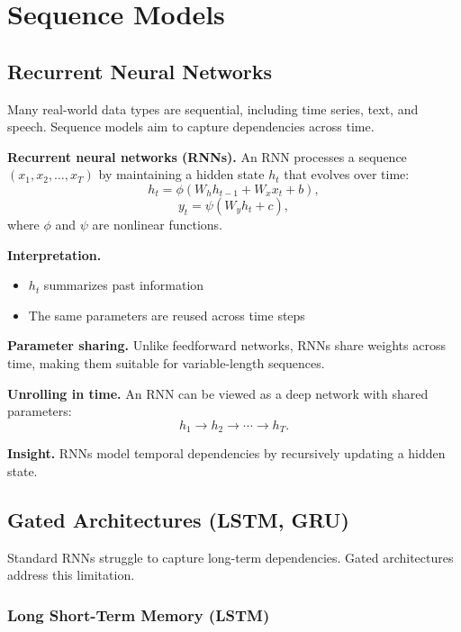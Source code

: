 \chapter{Sequence Models}

\section{Recurrent Neural Networks}

Many real-world data types are sequential, including time series, text, and speech. Sequence models aim to capture dependencies across time.

\medskip

\noindent
\textbf{Recurrent neural networks (RNNs).}  
An RNN processes a sequence $(x_1, x_2, \dots, x_T)$ by maintaining a hidden state $h_t$ that evolves over time:
\[
h_t = \phi(W_h h_{t-1} + W_x x_t + b),
\]
\[
y_t = \psi(W_y h_t + c),
\]
where $\phi$ and $\psi$ are nonlinear functions.

\medskip

\noindent
\textbf{Interpretation.}
\begin{itemize}
    \item $h_t$ summarizes past information
    \item The same parameters are reused across time steps
\end{itemize}

\medskip

\noindent
\textbf{Parameter sharing.}  
Unlike feedforward networks, RNNs share weights across time, making them suitable for variable-length sequences.

\medskip

\noindent
\textbf{Unrolling in time.}  
An RNN can be viewed as a deep network with shared parameters:
\[
h_1 \rightarrow h_2 \rightarrow \cdots \rightarrow h_T.
\]

\medskip

\noindent
\textbf{Insight.}  
RNNs model temporal dependencies by recursively updating a hidden state.

\section{Gated Architectures (LSTM, GRU)}

Standard RNNs struggle to capture long-term dependencies. Gated architectures address this limitation.

\subsection{Long Short-Term Memory (LSTM)}

